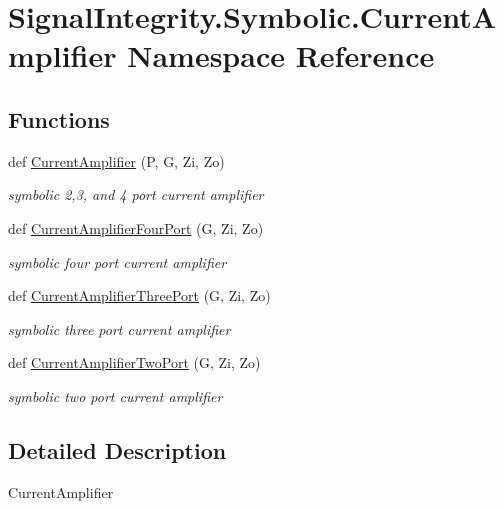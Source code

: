 \hypertarget{namespaceSignalIntegrity_1_1Symbolic_1_1CurrentAmplifier}{}\section{Signal\+Integrity.\+Symbolic.\+Current\+Amplifier Namespace Reference}
\label{namespaceSignalIntegrity_1_1Symbolic_1_1CurrentAmplifier}
\subsection*{Functions}
\begin{DoxyCompactItemize}
\item 
def \hyperlink{namespaceSignalIntegrity_1_1Symbolic_1_1CurrentAmplifier_ac0d0a52e8e363604f4898f7593c547a9}{Current\+Amplifier} (P, G, Zi, Zo)
\begin{DoxyCompactList}\small\item\em symbolic 2,3, and 4 port current amplifier \end{DoxyCompactList}\item 
def \hyperlink{namespaceSignalIntegrity_1_1Symbolic_1_1CurrentAmplifier_a21e694a8c904dd85e55a837390752709}{Current\+Amplifier\+Four\+Port} (G, Zi, Zo)
\begin{DoxyCompactList}\small\item\em symbolic four port current amplifier \end{DoxyCompactList}\item 
def \hyperlink{namespaceSignalIntegrity_1_1Symbolic_1_1CurrentAmplifier_a8e6c5041cf8fc38bd7bea0dd9482092d}{Current\+Amplifier\+Three\+Port} (G, Zi, Zo)
\begin{DoxyCompactList}\small\item\em symbolic three port current amplifier \end{DoxyCompactList}\item 
def \hyperlink{namespaceSignalIntegrity_1_1Symbolic_1_1CurrentAmplifier_a8a2e7af6ad7638ff892d665bb1969b93}{Current\+Amplifier\+Two\+Port} (G, Zi, Zo)
\begin{DoxyCompactList}\small\item\em symbolic two port current amplifier \end{DoxyCompactList}\end{DoxyCompactItemize}


\subsection{Detailed Description}
\begin{DoxyVerb}CurrentAmplifier\end{DoxyVerb}
 

